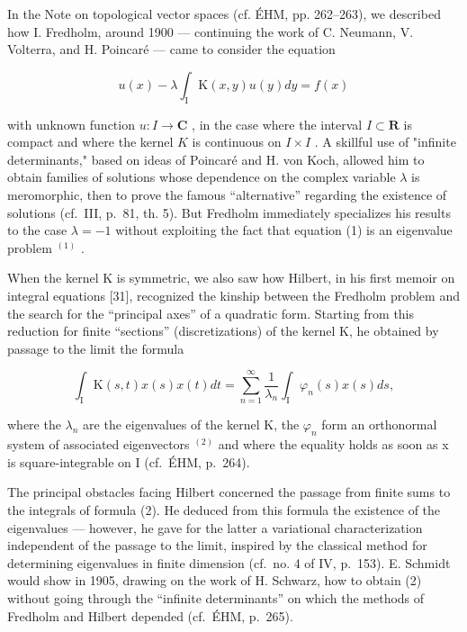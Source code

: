
In the Note on topological vector spaces (cf. ÉHM, pp. 262–263), we described how I. Fredholm, around 1900 — continuing the work of C. Neumann, V. Volterra, and H. Poincaré — came to consider the equation

\[
u (x) - \lambda \int_ {\mathrm{I}} \mathrm{K} (x, y) u (y) d y = f (x)\tag{1}
\]

with unknown function \(u\colon I\to\mathbf{C}\) , in the case where the interval \(I\subset\mathbf{R}\) is compact and where the kernel \(K\) is continuous on \(I\times I\) . A skillful use of "infinite determinants," based on ideas of Poincaré and H. von Koch, allowed him to obtain families of solutions whose dependence on the complex variable \(\lambda\) is meromorphic, then to prove the famous “alternative” regarding the existence of solutions (cf.~III, p.~81, th. 5). But Fredholm immediately specializes his results to the case \(\lambda = -1\) without exploiting the fact that equation (1) is an eigenvalue problem \(^{(1)}\) .

When the kernel K is symmetric, we also saw how Hilbert, in his first memoir on integral equations [31], recognized the kinship between the Fredholm problem and the search for the “principal axes” of a quadratic form. Starting from this reduction for finite “sections” (discretizations) of the kernel K, he obtained by passage to the limit the formula

\[
\int_ {\mathrm{I}} \mathrm{K} (s, t) x (s) x (t) d t = \sum_ {n = 1} ^ {\infty} \frac {1}{\lambda_ {n}} \int_ {\mathrm{I}} \varphi_ {n} (s) x (s) d s,\tag{2}
\]

where the \(\lambda_{n}\) are the eigenvalues of the kernel K, the \(\varphi_{n}\) form an orthonormal system of associated eigenvectors \(^{(2)}\) and where the equality holds as soon as x is square-integrable on I (cf.~ÉHM, p.~264).

The principal obstacles facing Hilbert concerned the passage from finite sums to the integrals of formula (2). He deduced from this formula the existence of the eigenvalues — however, he gave for the latter a variational characterization independent of the passage to the limit, inspired by the classical method for determining eigenvalues in finite dimension (cf.~no. 4 of IV, p.~153). E. Schmidt would show in 1905, drawing on the work of H. Schwarz, how to obtain (2) without going through the “infinite determinants” on which the methods of Fredholm and Hilbert depended (cf.~ÉHM, p.~265).

